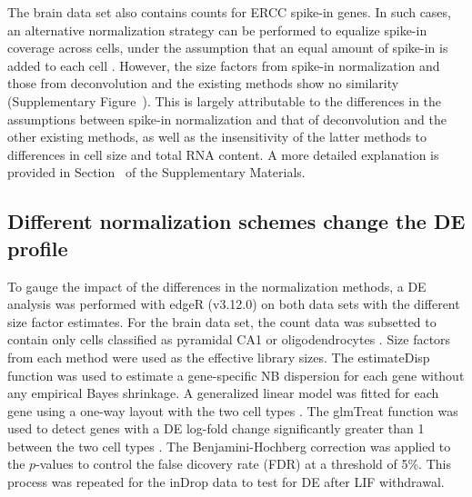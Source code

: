 \documentclass{article}
\begin{document}
The brain data set also contains counts for ERCC spike-in genes.
In such cases, an alternative normalization strategy can be performed to equalize spike-in coverage across cells, 
    under the assumption that an equal amount of spike-in is added to each cell \cite{stegle2015computational}.
However, the size factors from spike-in normalization and those from deconvolution and the existing methods show no similarity (Supplementary Figure~\suppspikefig{}).
This is largely attributable to the differences in the assumptions between spike-in normalization and that of deconvolution and the other existing methods,
    as well as the insensitivity of the latter methods to differences in cell size and total RNA content.
A more detailed explanation is provided in Section~\suppspikesec{} of the Supplementary Materials.

\subsection{Different normalization schemes change the DE profile}
To gauge the impact of the differences in the normalization methods, a DE analysis was performed with edgeR (v3.12.0) on both data sets with the different size factor estimates.
For the brain data set, the count data was subsetted to contain only cells classified as pyramidal CA1 or oligodendrocytes \cite{zeisel2015brain}.
Size factors from each method were used as the effective library sizes.
The estimateDisp function was used to estimate a gene-specific NB dispersion for each gene \cite{chen2014differential} without any empirical Bayes shrinkage.
A generalized linear model was fitted for each gene using a one-way layout with the two cell types \cite{mccarthy2012differential}.
The glmTreat function was used to detect genes with a DE log-fold change significantly greater than 1 between the two cell types \cite{mccarthy2009testing}.
The Benjamini-Hochberg correction was applied to the $p$-values to control the false dicovery rate (FDR) at a threshold of 5\%.
This process was repeated for the inDrop data to test for DE after LIF withdrawal.

\end{document}
